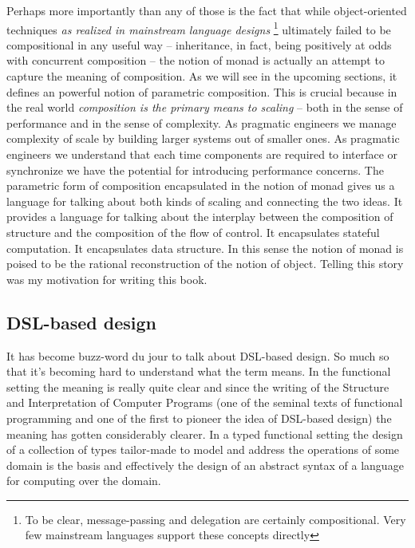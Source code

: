 Perhaps more importantly than any of those is the fact that while
object-oriented techniques \emph{as realized in mainstream language
  designs} \footnote{To be clear, message-passing and delegation are
  certainly compositional. Very few mainstream languages support these
  concepts directly} ultimately failed to be compositional in any
useful way -- inheritance, in fact, being positively at odds with
concurrent composition -- the notion of monad is actually an attempt
to capture the meaning of composition. As we will see in the upcoming
sections, it defines an powerful notion of parametric
composition. This is crucial because in the real world
\emph{composition is the primary means to scaling} -- both in the
sense of performance and in the sense of complexity. As pragmatic
engineers we manage complexity of scale by building larger systems out
of smaller ones. As pragmatic engineers we understand that each time
components are required to interface or synchronize we have the
potential for introducing performance concerns. The parametric form of
composition encapsulated in the notion of monad gives us a language
for talking about both kinds of scaling and connecting the two
ideas. It provides a language for talking about the interplay between
the composition of structure and the composition of the flow of
control. It encapsulates stateful computation. It encapsulates data
structure. In this sense the notion of monad is poised to be the
rational reconstruction of the notion of object. Telling this story
was my motivation for writing this book.

\subsection{DSL-based design}

It has become buzz-word du jour to talk about DSL-based design. So
much so that it's becoming hard to understand what the term means. In
the functional setting the meaning is really quite clear and since the
writing of the Structure and Interpretation of Computer Programs (one
of the seminal texts of functional programming and one of the first to
pioneer the idea of DSL-based design) the meaning has gotten
considerably clearer. In a typed functional setting the design of a
collection of types tailor-made to model and address the operations of
some domain is the basis and effectively the design of an abstract
syntax of a language for computing over the domain.

